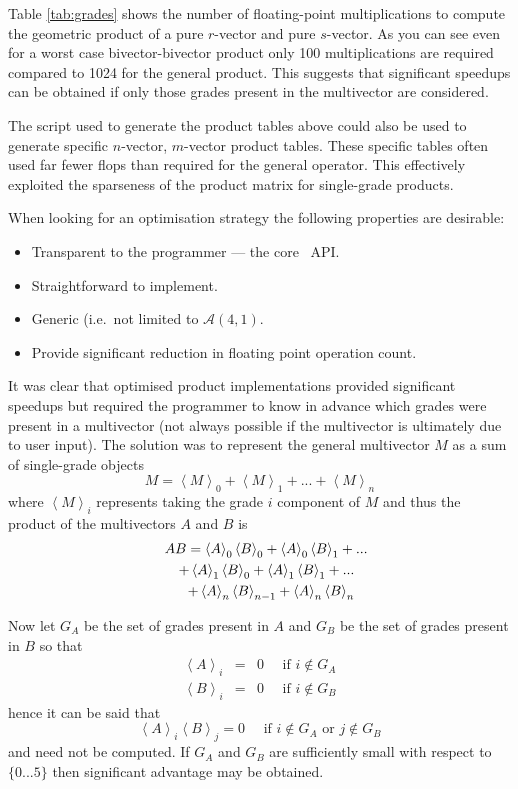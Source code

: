 Table \ref{tab:grades} shows the number of floating-point multiplications to
compute the geometric product of a pure $r$-vector and pure $s$-vector. As you can
see even for a worst case bivector-bivector product only 100 multiplications
are required compared to 1024 for the general product. This suggests that
significant speedups can be obtained if only those grades present in the
multivector are considered.

The script used to generate the product tables above could also be used to
generate specific $n$-vector, $m$-vector product tables. These specific
tables often used far fewer flops than required for the general operator.
This effectively exploited the sparseness of the product matrix for single-grade
products.

When looking for an optimisation strategy the following properties are desirable:

\begin{itemize}
\item Transparent to the programmer --- the core \libcga\ API.
\item Straightforward to implement.
\item Generic (i.e.\ not limited to $\mathcal{A}(4,1)$.
\item Provide significant reduction in floating point operation count.
\end{itemize}

It was clear that optimised product implementations provided significant speedups but
required the programmer to know in advance which grades were present in a 
multivector (not always possible if the multivector is ultimately due to
user input). The solution was to represent the general multivector $M$
as a sum of single-grade objects
\[
M = \left<M\right>_0 + \left<M\right>_1 + ... + \left<M\right>_n
\]
where $\left<M\right>_i$ represents taking the grade $i$ component of $M$ and thus
the product of the multivectors $A$ and $B$ is
\begin{eqnarray*}
\lefteqn{AB = \left<A\right>_0\left<B\right>_0 + \left<A\right>_0\left<B\right>_1 + ...} \\
   && + \left<A\right>_1\left<B\right>_0 + \left<A\right>_1\left<B\right>_1 + ...  \\
   && + \left<A\right>_n\left<B\right>_{n-1} + \left<A\right>_n\left<B\right>_n
\end{eqnarray*}

Now let $G_A$ be the set of grades present in $A$ and $G_B$ be the set of grades present
in $B$ so that
\begin{eqnarray*}
\left<A\right>_i & = & 0 \quad \mbox{ if } i \notin G_A \\
\left<B\right>_i & = & 0 \quad \mbox{ if } i \notin G_B
\end{eqnarray*}
hence it can be said that
\[
\left<A\right>_i\left<B\right>_j = 0 \quad \mbox{ if } i \notin G_A \mbox{ or } j \notin G_B
\]
and need not be computed. If $G_A$ and $G_B$ are sufficiently small with respect to
$\{0 ... 5\}$ then significant advantage may be obtained.

